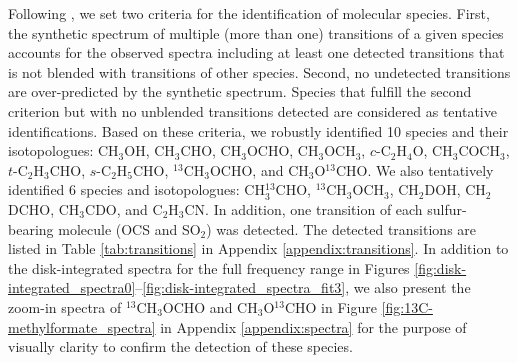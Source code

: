 \documentclass[linenumbers, twocolumn, twocolappendix, astrosymb, times]{aastex631}
\newcommand{\methanol}{CH$_3$OH\xspace}
\newcommand{\acetaldehyde}{CH$_3$CHO\xspace}
\newcommand{\methylformate}{CH$_3$OCHO\xspace}
\newcommand{\dimethylether}{CH$_3$OCH$_3$\xspace}
\newcommand{\acetone}{CH$_3$COCH$_3$\xspace}
\newcommand{\ethyleneoxide}{$c$-C$_2$H$_4$O\xspace}
\newcommand{\propenal}{$t$-C$_2$H$_3$CHO\xspace}
\newcommand{\propanal}{$s$-C$_2$H$_5$CHO\xspace}
\begin{document}
Following \citet{Jorgensen2020}, we set two criteria for the identification of molecular species. First, the synthetic spectrum of multiple (more than one) transitions of a given species accounts for the observed spectra including at least one detected transitions that is not blended with transitions of other species. Second, no undetected transitions are over-predicted by the synthetic spectrum. Species that fulfill the second criterion but with no unblended transitions detected are considered as tentative identifications. Based on these criteria, we robustly identified 10 species and their isotopologues: \methanol, \acetaldehyde, \methylformate, \dimethylether, \ethyleneoxide, \acetone, \propenal, \propanal, $^{13}$CH$_3$OCHO, and CH$_3$O$^{13}$CHO. We also tentatively identified 6 species and isotopologues: CH$_3^{13}$CHO, $^{13}$CH$_3$OCH$_3$, CH$_2$DOH, CH$_2$DCHO, CH$_3$CDO, and C$_2$H$_3$CN. In addition, one transition of each sulfur-bearing molecule (OCS and SO$_2$) was detected. The detected transitions are listed in Table \ref{tab:transitions} in Appendix \ref{appendix:transitions}. In addition to the disk-integrated spectra for the full frequency range in Figures \ref{fig:disk-integrated_spectra0}--\ref{fig:disk-integrated_spectra_fit3}, we also present the zoom-in spectra of $^{13}$CH$_3$OCHO and CH$_3$O$^{13}$CHO in Figure \ref{fig:13C-methylformate_spectra} in Appendix \ref{appendix:spectra} for the purpose of visually clarity to confirm the detection of these species.




\begin{figure*}
\caption{The 3.3 mm dust continuum image (left top) and the velocity-integrated intensity maps of the molecular line emission (others) in the V883 Ori disk. The velocity range for integration are $\pm3.5$ km s$^{-1}$ with respect to the source systemic velocity $v_\mathrm{sys}=4.25$ km s$^{-1}$ \citep{Tobin2023} including \dimethylether and \acetone, where multiple blended transitions are integrated together. The molecular species, transitions, and upper state energy levels are indicated in the upper-left corner of each panel. The black contours start from 5$\sigma$ with steps of 2.5$\sigma$, where $\sigma$ are the noise level of each map measured on the emission-free region, spanning $\sigma = 1.8$--4.4 mJy beam$^{-1}$ km s$^{-1}$ depending on the maps. The synthesized beam and a scale bar of 80 au are shown in the lower left and right corner of each panel, respectively.}
\label{fig:moment_zero_gallery}
\end{figure*}
\end{document}
